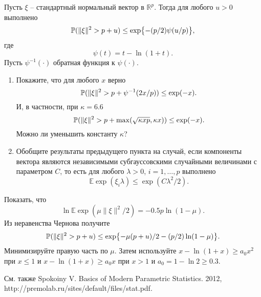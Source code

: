 \begin{problem} [В.Г. Спокойный]
\label{sec:spokoiny}
Пусть  $\xi$ -- стандартный нормальный вектор в $\mathbb{R}^p$. Тогда для любого $u>0$ выполнено 
\begin{equation*}
\mathrm{{\mathbb P}}(\|\xi\|^2 >p+u)\leq \exp\bigl\{-(p/2)\psi(u/p)\bigr\},
\end{equation*}
где
\begin{equation*}
\psi(t) = t-\ln(1+t).
\end{equation*}
Пусть $\psi ^{-1}(\cdot)$ обратная функция к $\psi (\cdot)$. 
\begin{enumerate}
\item
Покажите, что для любого $x$ верно 
\begin{equation*}
\mathrm{{\mathbb P}}(\|\xi\|^2>p+\psi^{-1}(2x/p))\leq\exp (-x).
\end{equation*}
И, в частности, при $\kappa = 6.6$
\begin{equation*}
\mathrm{{\mathbb P}}(\|\xi\|^2>p+ \max (\sqrt{\kappa xp}, \kappa x))\leq \exp(-x).
\end{equation*}
Можно ли уменьшить константу $\kappa$?
\item 
Обобщите результаты предыдущего пункта на случай, если компоненты вектора являются независимыми субгауссовскими случайными величинами с параметром $C$, то есть для любого $\lambda>0$, $i=1,\dots,p$ выполнено
\begin{equation*}
\mathbb{E}\exp(\xi_i\lambda)\leq \exp(C\lambda^2/2).
\end{equation*}

\end{enumerate}
\end{problem}

\begin{ordre}
Показать, что 
\begin{equation*}
\ln\mathbb{E}\exp(\mu\|\xi\|^2/2) = -0.5p\ln(1-\mu).
\end{equation*}
Из неравенства Чернова получите
\begin{equation*}
\mathrm{{\mathbb P}}(\|\xi\|^2>p+u)\leq\exp \bigl\{-\mu(p+u)/2-(p/2)\ln(1-\mu)\bigr\}.
\end{equation*}
Минимизируйте правую часть по $\mu$. Затем используйте $x-\ln(1+x)\geq a_0x^2$ при $x\leq 1$ и $x-\ln(1+x)\geq a_0x$ при $x>1$  и $a_0=1-\ln 2\geq 0.3$.
\end{ordre}
\begin{remark}
См. также Spokoiny V. Basics of Modern Parametric Statistics. 2012, http://premolab.ru/sites/default/files/stat.pdf.
\end{remark}

